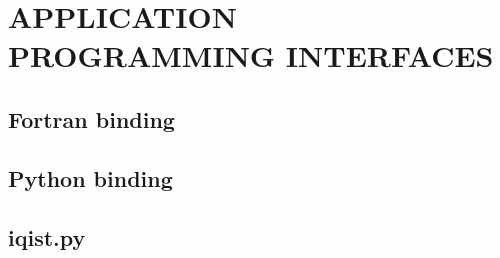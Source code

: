 \chapter{APPLICATION PROGRAMMING INTERFACES}
\section{Fortran binding}
\section{Python binding}
\section{iqist.py}
